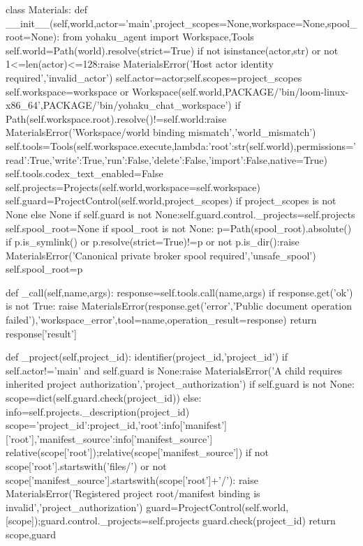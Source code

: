 class Materials:
    def __init__(self,world,actor='main',project_scopes=None,workspace=None,spool_root=None):
        from yohaku_agent import Workspace,Tools
        self.world=Path(world).resolve(strict=True)
        if not isinstance(actor,str) or not 1<=len(actor)<=128:raise MaterialsError('Host actor identity required','invalid_actor')
        self.actor=actor;self.scopes=project_scopes
        self.workspace=workspace or Workspace(self.world,PACKAGE/'bin/loom-linux-x86_64',PACKAGE/'bin/yohaku_chat_workspace')
        if Path(self.workspace.root).resolve()!=self.world:raise MaterialsError('Workspace/world binding mismatch','world_mismatch')
        self.tools=Tools(self.workspace.execute,lambda:{'root':str(self.world)},permissions={'read':True,'write':True,'run':False,'delete':False,'import':False},native=True)
        self.tools.codex_text_enabled=False
        self.projects=Projects(self.world,workspace=self.workspace)
        self.guard=ProjectControl(self.world,project_scopes) if project_scopes is not None else None
        if self.guard is not None:self.guard.control._projects=self.projects
        self.spool_root=None
        if spool_root is not None:
            p=Path(spool_root).absolute()
            if p.is_symlink() or p.resolve(strict=True)!=p or not p.is_dir():raise MaterialsError('Canonical private broker spool required','unsafe_spool')
            self.spool_root=p

    def _call(self,name,args):
        response=self.tools.call(name,args)
        if response.get('ok') is not True:
            raise MaterialsError(response.get('error','Public document operation failed'),'workspace_error',tool=name,operation_result=response)
        return response['result']

    def _project(self,project_id):
        identifier(project_id,'project_id')
        if self.actor!='main' and self.guard is None:raise MaterialsError('A child requires inherited project authorization','project_authorization')
        if self.guard is not None:
            scope=dict(self.guard.check(project_id))
        else:
            info=self.projects._description(project_id)
            scope={'project_id':project_id,'root':info['manifest']['root'],'manifest_source':info['manifest_source']}
        relative(scope['root']);relative(scope['manifest_source'])
        if not scope['root'].startswith('files/') or not scope['manifest_source'].startswith(scope['root']+'/'):
            raise MaterialsError('Registered project root/manifest binding is invalid','project_authorization')
        guard=ProjectControl(self.world,[scope]);guard.control._projects=self.projects
        guard.check(project_id)
        return scope,guard

